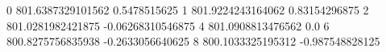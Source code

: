 0 801.6387329101562 0.5478515625
1 801.9224243164062 0.83154296875
2 801.0281982421875 -0.06268310546875
4 801.0908813476562 0.0
6 800.8275756835938 -0.2633056640625
8 800.1033325195312 -0.987548828125
